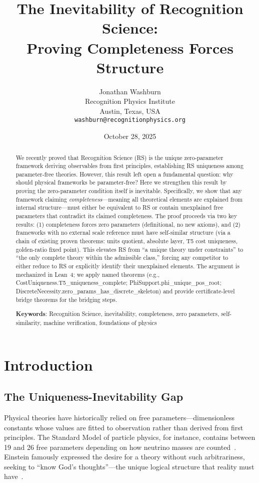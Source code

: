 \documentclass[12pt]{article}
\title{The Inevitability of Recognition Science:\\
       Proving Completeness Forces Structure}
\author{
  Jonathan Washburn\\
  Recognition Physics Institute\\
  Austin, Texas, USA\\
  \texttt{washburn@recognitionphysics.org}
}
\date{October 28, 2025}
\theoremstyle{remark}
\begin{document}
\maketitle

\begin{abstract}
We recently proved that Recognition Science (RS) is the unique zero-parameter framework deriving observables from first principles, establishing RS uniqueness among parameter-free theories. However, this result left open a fundamental question: why should physical frameworks be parameter-free? Here we strengthen this result by proving the zero-parameter condition itself is inevitable. Specifically, we show that any framework claiming \emph{completeness}---meaning all theoretical elements are explained from internal structure---must either be equivalent to RS or contain unexplained free parameters that contradict its claimed completeness. The proof proceeds via two key results: (1) completeness forces zero parameters (definitional, no new axioms), and (2) frameworks with no external scale reference must have self-similar structure (via a chain of existing proven theorems: units quotient, absolute layer, T5 cost uniqueness, golden-ratio fixed point). This elevates RS from ``a unique theory under constraints'' to ``the only complete theory within the admissible class,'' forcing any competitor to either reduce to RS or explicitly identify their unexplained elements. The argument is mechanized in Lean~4; we apply named theorems (e.g., CostUniqueness.T5\_uniqueness\_complete; PhiSupport.phi\_unique\_pos\_root; DiscreteNecessity.zero\_params\_has\_discrete\_skeleton) and provide certificate-level bridge theorems for the bridging steps.

\vspace{0.5em}
\noindent\textbf{Keywords}: Recognition Science, inevitability, completeness, zero parameters, self-similarity, machine verification, foundations of physics
\end{abstract}

\section{Introduction}

\subsection{The Uniqueness-Inevitability Gap}

Physical theories have historically relied on free parameters---dimensionless constants whose values are fitted to observation rather than derived from first principles. The Standard Model of particle physics, for instance, contains between 19 and 26 free parameters depending on how neutrino masses are counted~\cite{PDG2024}. Einstein famously expressed the desire for a theory without such arbitrariness, seeking to ``know God's thoughts''---the unique logical structure that reality must have~\cite{Einstein1954}.
\end{document}
